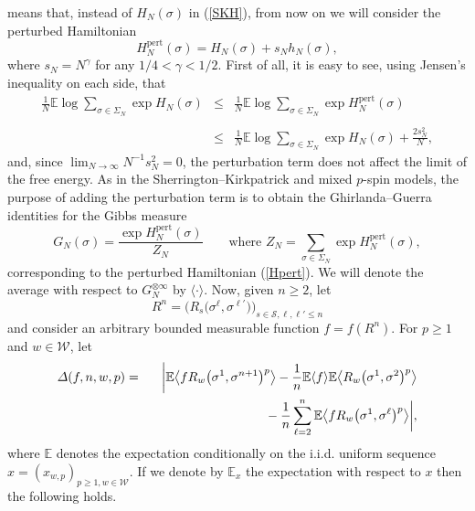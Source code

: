 \documentclass[aop,MSNbibl,dvips]{arximspdf}
\def\cal{\mathscr}
\newcommand{\spe}{{\cal S}}
\newcommand{\WW}{{\cal W}}
\newcommand{\smsp}{}
\newcommand{\e}{\mathbb{E}}
\newcommand{\la}{\langle}
\newcommand{\ra}{\rangle}
\begin{document}
means that, instead of $H_N(\sigma)$ in (\ref{SKH}), from now on we
will consider the perturbed Hamiltonian
%
\begin{equation}
H_N^{\mathrm{pert}}(\sigma) = H_N(\sigma) +
s_N h_N(\sigma), \label{Hpert}
\end{equation}
%
where $s_N=N^{\gamma}$ for any $1/4<\gamma<1/2$. First of all, it is
easy to see, using Jensen's inequality on each side, that
%
\begin{eqnarray}\label{compareF}
\frac{1}{N}\smsp\e\log\sum_{\sigma\in\Sigma_N} \exp
H_N(\sigma) & \leq& \frac{1}{N}\smsp\e\log\sum
_{\sigma\in\Sigma_N} \exp H_N^{\mathrm
{pert}}(\sigma)
\nonumber
\\[-8pt]
\\[-8pt]
\nonumber
& \leq& \frac{1}{N}\smsp\e\log\sum_{\sigma\in\Sigma_N} \exp
H_N(\sigma) + \frac{2s_N^2}{N},
\nonumber
\end{eqnarray}
%
and, since $\lim_{N\to\infty} N^{-1} s_N^2 = 0$, the perturbation term
does not affect the limit of the free energy. As in the
Sherrington--Kirkpatrick and mixed $p$-spin models, the purpose of
adding the perturbation term is to obtain the Ghirlanda--Guerra
identities for the Gibbs measure
%
\begin{equation}
G_N(\sigma) = \frac{\exp H_N^{\mathrm{pert}} (\sigma)}{Z_N} \qquad\mbox{where } Z_N =
\sum_{\sigma\in\Sigma_{N}} \exp H_N^{\mathrm
{pert}}(
\sigma), \label{GNpert}
\end{equation}
%
corresponding to the perturbed Hamiltonian (\ref{Hpert}). We will
denote the average with respect to $G_N^{\otimes\infty}$ by $\la
\cdot \ra$. Now, given $n\geq2$, let
%
\[
R^n = \bigl(R_s\bigl(\sigma^\ell,
\sigma^{\ell'}\bigr) \bigr)_{s\in\spe,
\ell,\ell
'\leq n}
\]
%
and consider an arbitrary bounded measurable function $f=f(R^n)$. For
$p\geq1$ and $w\in\WW$, let
%
\begin{eqnarray}\label{GGfinite}
\varDelta(f,n,w, p) &=&\biggl| {\e} \bigl\la f R_w \bigl(\sigma^1,
\sigma^{n+1} \bigr)^p\bigr \ra  - \frac{1}{n} {\e} \la f
\ra\smsp{\e} \bigl\la R_w \bigl(\sigma^1,\sigma^2
\bigr)^p \bigr\ra
\nonumber
\\[-8pt]
\\[-8pt]
\nonumber
&&\hspace*{89pt}{} - \frac{1}{n}\sum_{\ell=2}^{n}{\e}
\bigl\la f R_w \bigl(\sigma ^1,\sigma ^\ell
\bigr)^p \bigr\ra \biggr|,
\end{eqnarray}
%
where ${\e}$ denotes the expectation conditionally on the i.i.d.
uniform sequence $x=(x_{w,p})_{p\geq1,w\in\WW}$. If we denote by $\e
_x$ the expectation with respect to $x$ then the following holds.
\end{document}

